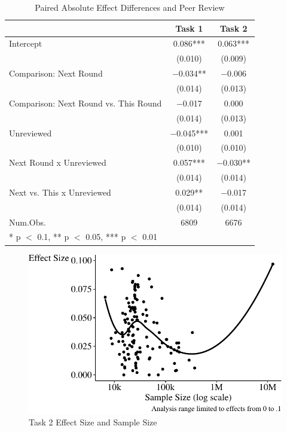 \documentclass[
  letterpaper,
  DIV=11,
  numbers=noendperiod]{scrartcl}
\begin{document}
\begin{table}
\centering
\caption{Paired Absolute Effect Differences and Peer Review \label{tab-peer-review-reg}}
\centering
\begin{tabular}[t]{lcc}
\toprule
  & Task 1 & Task 2\\
\midrule
Intercept & \num{0.086}*** & \num{0.063}***\\
 & (\num{0.010}) & (\num{0.009})\\
Comparison: Next Round & \num{-0.034}** & \num{-0.006}\\
 & (\num{0.014}) & \vphantom{1} (\num{0.013})\\
Comparison: Next Round vs. This Round & \num{-0.017} & \num{0.000}\\
 & (\num{0.014}) & (\num{0.013})\\
Unreviewed & \num{-0.045}*** & \num{0.001}\\
 & (\num{0.010}) & (\num{0.010})\\
Next Round x Unreviewed & \num{0.057}*** & \num{-0.030}**\\
 & (\num{0.014}) & \vphantom{1} (\num{0.014})\\
Next vs. This x Unreviewed & \num{0.029}** & \num{-0.017}\\
 & (\num{0.014}) & (\num{0.014})\\
\midrule
Num.Obs. & \num{6809} & \num{6676}\\
\bottomrule
\multicolumn{3}{l}{\rule{0pt}{1em}* p $<$ 0.1, ** p $<$ 0.05, *** p $<$ 0.01}\\
\end{tabular}
\end{table}

\begin{figure}

{\centering \includegraphics{The-Sources-of-Researcher-Variation-in-Economics_files/figure-pdf/fig-effect-vs-sample-1.pdf}

}

\caption{\label{fig-effect-vs-sample}Task 2 Effect Size and Sample Size}

\end{figure}
\end{document}
